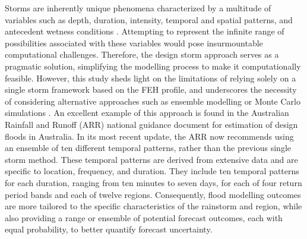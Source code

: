 \documentclass[APA,Times2COL]{WileyNJDv5}
\begin{document}
Storms are inherently unique phenomena characterized by a multitude of variables such as depth, duration, intensity, temporal and spatial patterns, and antecedent wetness conditions \citep{loveridge2018monte}. Attempting to represent the infinite range of possibilities associated with these variables would pose insurmountable computational challenges. Therefore, the design storm approach serves as a pragmatic solution, simplifying the modelling process to make it computationally feasible. However, this study sheds light on the limitations of relying solely on a single storm framework based on the FEH profile, and underscores the necessity of considering alternative approaches such as ensemble modelling or Monte Carlo simulations \citep{nathan2003use}. An excellent example of this approach is found in the Australian Rainfall and Runoff (ARR) national guidance document for estimation of design floods in Australia. In its most recent update, the ARR now recommends using an ensemble of ten different temporal patterns, rather than the previous single storm method. These temporal patterns are derived from extensive data and are specific to location, frequency, and duration. They include ten temporal patterns for each duration, ranging from ten minutes to seven days, for each of four return period bands and each of twelve regions. Consequently, flood modelling outcomes are more tailored to the specific characteristics of the rainstorm and region, while also providing a range or ensemble of potential forecast outcomes, each with equal probability, to better quantify forecast uncertainty. 

\end{document}
